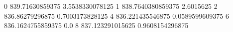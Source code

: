 0 839.71630859375 3.5538330078125
1 838.7640380859375 2.6015625
2 836.86279296875 0.7003173828125
4 836.221435546875 0.0589599609375
6 836.1624755859375 0.0
8 837.123291015625 0.9608154296875
